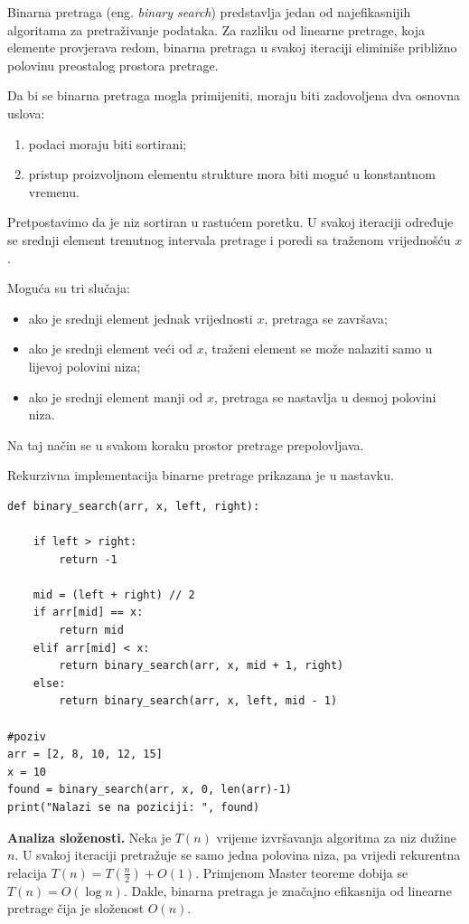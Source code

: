 Binarna pretraga (eng. \emph{binary search}) predstavlja jedan od najefikasnijih algoritama za pretraživanje podataka. Za razliku od linearne pretrage, koja elemente provjerava redom, binarna pretraga u svakoj iteraciji eliminiše približno polovinu preostalog prostora pretrage.

Da bi se binarna pretraga mogla primijeniti, moraju biti zadovoljena dva osnovna uslova:

\begin{enumerate}
	\item podaci moraju biti sortirani;
	\item pristup proizvoljnom elementu strukture mora biti moguć u konstantnom vremenu.
\end{enumerate}

Pretpostavimo da je niz sortiran u rastućem poretku. U svakoj iteraciji određuje se srednji element trenutnog intervala pretrage i poredi sa traženom vrijednošću $x$.

Moguća su tri slučaja:

\begin{itemize}
	\item ako je srednji element jednak vrijednosti $x$, pretraga se završava;
	\item ako je srednji element veći od $x$, traženi element se može nalaziti samo u lijevoj polovini niza;
	\item ako je srednji element manji od $x$, pretraga se nastavlja u desnoj polovini niza.
\end{itemize}

Na taj način se u svakom koraku prostor pretrage prepolovljava.

Rekurzivna implementacija binarne pretrage prikazana je u nastavku.

\begin{verbatim}
def binary_search(arr, x, left, right):

    if left > right:
        return -1
        
    mid = (left + right) // 2
    if arr[mid] == x:
        return mid
    elif arr[mid] < x:
        return binary_search(arr, x, mid + 1, right)
    else:
        return binary_search(arr, x, left, mid - 1)

#poziv
arr = [2, 8, 10, 12, 15]
x = 10
found = binary_search(arr, x, 0, len(arr)-1)
print("Nalazi se na poziciji: ", found)
\end{verbatim}

\textbf{Analiza složenosti.} Neka je $T(n)$ vrijeme izvršavanja algoritma za niz dužine $n$. U svakoj iteraciji pretražuje se samo jedna polovina niza, pa vrijedi rekurentna relacija $T(n)=T\left(\frac{n}{2}\right)+O(1).$ Primjenom Master teoreme dobija se $T(n)=O(\log n).$ Dakle, binarna pretraga je značajno efikasnija od linearne pretrage čija je složenost $O(n)$.

